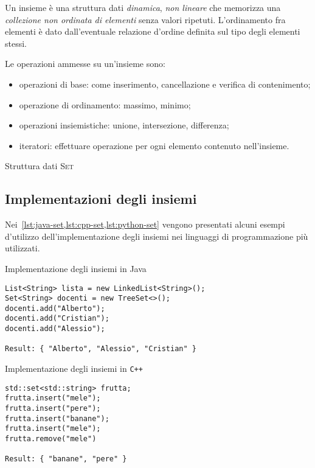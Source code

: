 Un insieme è una struttura dati \emph{dinamica}, \emph{non lineare} che memorizza una \emph{collezione non ordinata di elementi} senza valori ripetuti.
L'ordinamento fra elementi è dato dall'eventuale relazione d'ordine definita sul tipo degli elementi stessi.

Le operazioni ammesse su un'insieme sono:
\begin{itemize}
	\item operazioni di base: come inserimento, cancellazione e verifica di contenimento;
	\item operazione di ordinamento: massimo, minimo;
	\item operazioni insiemistiche: unione, intersezione, differenza;
	\item iteratori: effettuare operazione per ogni elemento contenuto nell'insieme.
\end{itemize}

\begin{algorithm}[H]
	\caption[Struttura dati insieme]{Struttura dati \textsc{Set}}
	
\end{algorithm}

\subsection{Implementazioni degli insiemi}

Nei~\cref{lst:java-set,lst:cpp-set,lst:python-set} vengono presentati alcuni esempi d'utilizzo dell'implementazione degli insiemi nei linguaggi di programmazione più utilizzati.

\begin{listing}[H]
\caption{Implementazione degli insiemi in Java}%
\label{lst:java-set}
\begin{verbatim}
List<String> lista = new LinkedList<String>();
Set<String> docenti = new TreeSet<>();
docenti.add("Alberto");
docenti.add("Cristian");
docenti.add("Alessio");

Result: { "Alberto", "Alessio", "Cristian" }
\end{verbatim}
\end{listing}
\vspace{-10pt}

\begin{listing}[H]
\caption{Implementazione degli insiemi in \texttt{C++}}%
\label{lst:cpp-set}
\begin{verbatim}
std::set<std::string> frutta;
frutta.insert("mele");
frutta.insert("pere");
frutta.insert("banane");
frutta.insert("mele");
frutta.remove("mele")

Result: { "banane", "pere" }
\end{verbatim}
\end{listing}
\vspace{-10pt}

